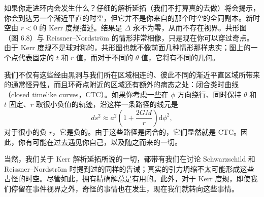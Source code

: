 如果你走进环内会发生什么？仔细的解析延拓（我们不打算真的去做）将会揭示，你会到达另一个渐近平直的时空，但它并不是你来自的那个时空的全同副本。新时空由 $r<0$ 的 Kerr 度规描述。结果是 $\Delta$ 永不为零，从而不存在视界。共形图（图 6.8）与 Reissner–Nordström 的情形非常相像，只是现在你可以穿过奇点。由于 Kerr 度规不是球对称的，共形图也就不像前面几种情形那样忠实；图上的一个点代表固定的 $t$ 和 $r$ 值，而对于不同的 $\theta$ 值，它将有不同的几何。



我们不仅有这些经由黑洞与我们所在区域相连的、彼此不同的渐近平直区域所带来的通常怪异性，而且环奇点附近的区域还有额外的病态之处：闭合类时曲线（closed timelike curves，CTC）。如果你考虑一些在 $\phi$ 方向绕行、同时保持 $\theta$ 和 $t$ 固定、$r$ 取很小负值的轨迹，沿这样一条路径的线元是
\begin{equation*}
ds^{2} \approx a^{2}\left(1+\frac{2GM}{r}\right)\mathrm{d}\phi^{2},
\tag{6.88}
\end{equation*}
对于很小的负 $r$，它是负的。由于这些路径是闭合的，它们显然就是 CTC。因此，你有可能在过去遇见你自己，以及随之而来的一切。

当然，我们关于 Kerr 解析延拓所说的一切，都带有我们在讨论 Schwarzschild 和 Reissner–Nordström 时提到过的同样的告诫；真实的引力坍缩不太可能形成这些古怪的时空。尽管如此，拥有精确解总是有用的。此外，对于 Kerr 度规，即使我们停留在事件视界之外，奇怪的事情也在发生，现在我们就转向这些事情。

